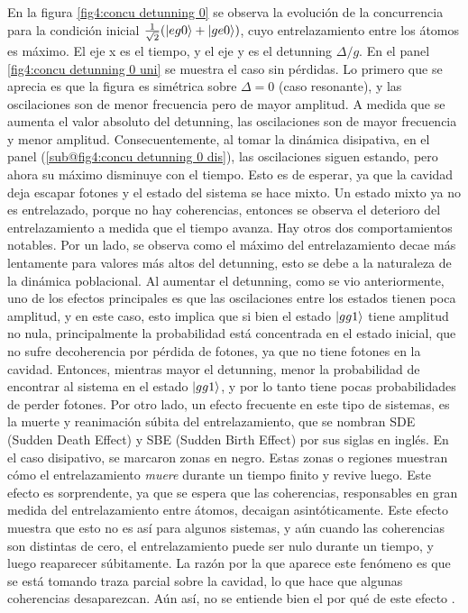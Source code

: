 En la figura \ref{fig4:concu detunning 0} se observa la evolución de la concurrencia para la condición inicial $\frac{1}{\sqrt{2}}(\ket{eg0}+\ket{ge0})$, cuyo entrelazamiento entre los átomos es máximo. El eje x es el tiempo, y el eje y es el detunning $\Delta/g$. En el panel \ref{fig4:concu detunning 0 uni} se muestra el caso sin pérdidas. Lo primero que se aprecia es que la figura es simétrica sobre $\Delta=0$ (caso resonante), y las oscilaciones son de menor frecuencia pero de mayor amplitud. A medida que se aumenta el valor absoluto del detunning, las oscilaciones son de mayor frecuencia y menor amplitud. Consecuentemente, al tomar la dinámica disipativa, en el panel (\ref{sub@fig4:concu detunning 0 dis}), las oscilaciones siguen estando, pero ahora su máximo disminuye con el tiempo. Esto es de esperar, ya que la cavidad deja escapar fotones y el estado del sistema se hace mixto. Un estado mixto ya no es entrelazado, porque no hay coherencias, entonces se observa el deterioro del entrelazamiento a medida que el tiempo avanza. Hay otros dos comportamientos notables. 
Por un lado, se observa como el máximo del entrelazamiento decae más lentamente para valores más altos del detunning, esto se debe a la naturaleza de la dinámica poblacional. Al aumentar el detunning, como se vio anteriormente, uno de los efectos principales es que las oscilaciones entre los estados tienen poca amplitud, y en este caso, esto implica que si bien el estado $\ket{gg1}$ tiene amplitud no nula, principalmente la probabilidad está concentrada en el estado inicial, que no sufre decoherencia por pérdida de fotones, ya que no tiene fotones en la cavidad. Entonces, mientras mayor el detunning, menor la probabilidad de encontrar al sistema en el estado $\ket{gg1}$, y por lo tanto tiene pocas probabilidades de perder fotones. Por otro lado, un efecto frecuente en este tipo de sistemas, es la muerte y reanimación súbita del entrelazamiento, que se nombran SDE (Sudden Death Effect) y SBE (Sudden Birth Effect) por sus siglas en inglés. En el caso disipativo, se marcaron zonas en negro. Estas zonas o regiones muestran cómo el entrelazamiento \textit{muere} durante un tiempo finito y revive luego. Este efecto es sorprendente, ya que se espera que las coherencias, responsables en gran medida del entrelazamiento entre átomos, decaigan asintóticamente. Este efecto muestra que esto no es así para algunos sistemas, y aún cuando las coherencias son distintas de cero, el entrelazamiento puede ser nulo durante un tiempo, y luego reaparecer súbitamente. La razón por la que aparece este fenómeno es que se está tomando traza parcial sobre la cavidad, lo que hace que algunas coherencias desaparezcan. Aún así, no se entiende bien el por qué de este efecto \cite{Roncaglia2008}.

